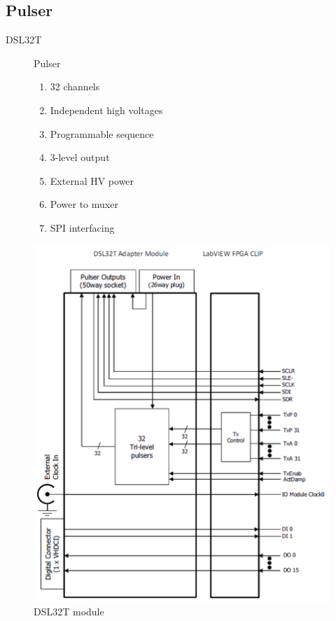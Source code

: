 \documentclass[t,12pt,english
\ifx\beamermode\undefined\else,\beamermode\fi
]{beamer}
\begin{document}
\subsection{Pulser}
\begin{frame}{DSL32T}



\begin{figure}[!htb]

\begin{block}{\footnotesize{Pulser}}\footnotesize{}
\begin{enumerate} 
\vspace{0.05cm}
     \item \footnotesize{32 channels}
     \item \footnotesize{Independent high voltages}
     \item \footnotesize{Programmable sequence}
     \item \footnotesize{3-level output}
     \item \footnotesize{External HV power}
     \item \footnotesize{Power to muxer}
     \item \footnotesize{SPI interfacing}
\end{enumerate}
\end{block}

\endminipage
{}
\centering
\includegraphics[width=.85\textwidth]{11.png}
\caption{\tiny{DSL32T module}}
\endminipage
\end{figure}

\end{frame}
\end{document}
